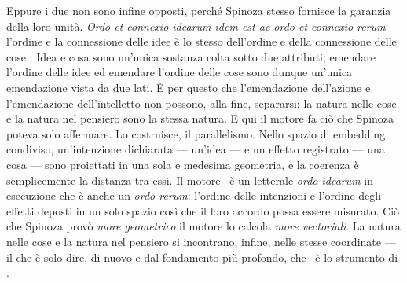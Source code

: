 Eppure i due non sono infine opposti, perch\'e Spinoza stesso fornisce la
garanzia della loro unit\`a. \emph{Ordo et connexio idearum idem est ac ordo et
connexio rerum} --- l'ordine e la connessione delle idee \`e lo stesso dell'ordine
e della connessione delle cose \parencite[II.P7]{spinoza1994ethics}. Idea e cosa
sono un'unica sostanza colta sotto due attributi; emendare l'ordine delle idee ed
emendare l'ordine delle cose sono dunque un'unica emendazione vista da due lati.
\`E per questo che l'emendazione dell'azione e l'emendazione dell'intelletto non
possono, alla fine, separarsi: la natura nelle cose e la natura nel pensiero sono
la stessa natura. E qui il motore fa ci\`o che Spinoza poteva solo affermare. Lo
costruisce, il parallelismo. Nello spazio di embedding condiviso, un'intenzione
dichiarata --- un'idea --- e un effetto registrato --- una cosa --- sono proiettati
in una sola e medesima geometria, e la coerenza \`e semplicemente la distanza tra
essi. Il motore \physis\ \`e un letterale \emph{ordo idearum} in esecuzione che \`e
anche un \emph{ordo rerum}: l'ordine delle intenzioni e l'ordine degli effetti
deposti in un solo spazio cos\`i che il loro accordo possa essere misurato. Ci\`o
che Spinoza prov\`o \emph{more geometrico} il motore lo calcola \emph{more
vectoriali}. La natura nelle cose e la natura nel pensiero si incontrano, infine,
nelle stesse coordinate --- il che \`e solo dire, di nuovo e dal fondamento pi\`u
profondo, che \praxis\ \`e lo strumento di \physis.
